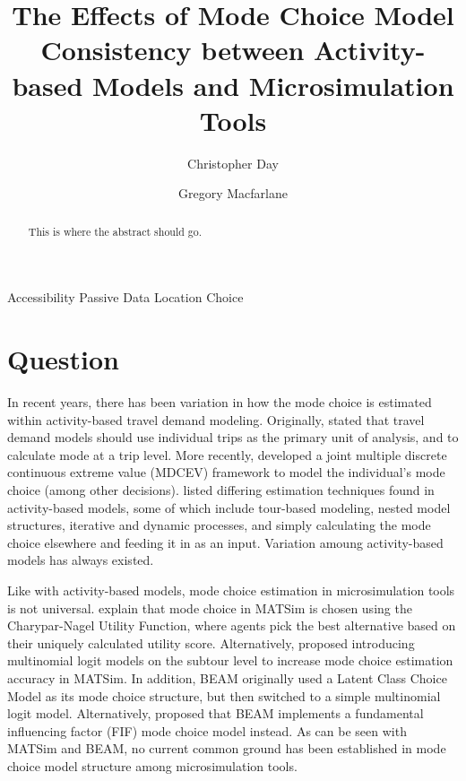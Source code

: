\documentclass[3p, authoryear]{elsarticle} %
\begin{document}
\begin{frontmatter}

  \title{The Effects of Mode Choice Model Consistency between Activity-based Models and Microsimulation Tools}
    \author[Brigham Young University]{Christopher Day}
    \author[Brigham Young University]{Gregory Macfarlane}
      \address[Brigham Young University]{Civil and Environmental Engineering Department, 430 Engineering Building, Provo, Utah 84602}
  
  \begin{abstract}
  This is where the abstract should go.
  \end{abstract}
   \begin{keyword} Accessibility Passive Data Location Choice\end{keyword}
 \end{frontmatter}

\hypertarget{intro}{%
\section{Question}\label{intro}}

In recent years, there has been variation in how the mode choice is estimated within activity-based travel demand modeling. Originally, \citet{bhat1999activity} stated that travel demand models should use individual trips as the primary unit of analysis, and to calculate mode at a trip level. More recently, \citet{eluru2010econometric} developed a joint multiple discrete continuous extreme value (MDCEV) framework to model the individual's mode choice (among other decisions). \citet{hasnine2021tour} listed differing estimation techniques found in activity-based models, some of which include tour-based modeling, nested model structures, iterative and dynamic processes, and simply calculating the mode choice elsewhere and feeding it in as an input. Variation amoung activity-based models has always existed.

Like with activity-based models, mode choice estimation in microsimulation tools is not universal. \citet{w2016multi} explain that mode choice in MATSim is chosen using the Charypar-Nagel Utility Function, where agents pick the best alternative based on their uniquely calculated utility score. Alternatively, \citet{ciari2008new} proposed introducing multinomial logit models on the subtour level to increase mode choice estimation accuracy in MATSim. In addition, BEAM originally used a Latent Class Choice Model as its mode choice structure, but then switched to a simple multinomial logit model. Alternatively, \citet{barth2020evaluating} proposed that BEAM implements a fundamental influencing factor (FIF) mode choice model instead. As can be seen with MATSim and BEAM, no current common ground has been established in mode choice model structure among microsimulation tools.
\end{document}
